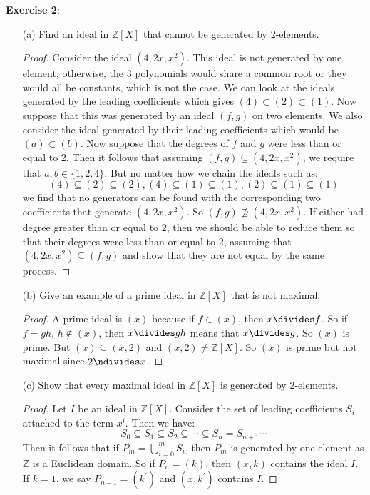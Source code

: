 \documentclass{article}
\begin{document}
\textbf{Exercise 2}: 
    \begin{itemize}
        \item [(a)] Find an ideal in $\mathbb{Z}[X]$ that cannot be generated by 2-elements.
            \begin{proof}
                Consider the ideal $(4, 2x, x^{2})$. This ideal is not generated by one element, otherwise, the 3 polynomials would share a common root or they would all be constants, which is not the case. We can look at the ideals generated by the leading coefficients which gives $(4) \subset (2) \subset (1)$. Now suppose that this was generated by an ideal $(f, g)$ on two elements. We also consider the ideal generated by their leading coefficients which would be $(a) \subset (b)$. Now suppose that the degrees of $f$ and $g$ were less than or equal to $2$. Then it follows that assuming $(f, g) \subseteq (4, 2x, x^{2})$, we require that $a, b \in\{1, 2, 4\}$. But no matter how we chain the ideals such as:
                    \begin{equation*}
                        (4) \subseteq (2) \subseteq (2), (4) \subseteq (1) \subseteq (1), (2) \subseteq (1) \subseteq (1)
                    \end{equation*}
                we find that no generators can be found with the corresponding two coefficients that generate $(4, 2x, x^{2})$. So $(f, g) \not\supseteq (4, 2x, x^{2})$. If either had degree greater than or equal to  $2$, then we should be able to reduce them so that their degrees were less than or equal to $2$, assuming that $(4, 2x, x^{2}) \subseteq (f, g)$ and show that they are not equal by the same process.
            \end{proof}

        \item [(b)] Give an example of a prime ideal in $\mathbb{Z}[X]$ that is not maximal.
            \begin{proof}
                A prime ideal is $(x)$ because if $f \in (x)$, then $x \divides f$. So if $f = gh$, $h \notin (x)$, then $x \divides gh$ means that $x \divides g$. So $(x)$ is prime. But $(x) \subseteq (x, 2)$ and $(x, 2) \neq \mathbb{Z}[X]$. So $(x)$ is prime but not maximal since $2 \ndivides x$.
            \end{proof}

        \item [(c)] Show that every maximal ideal in $\mathbb{Z}[X]$ is generated by $2$-elements. 
            \begin{proof}
                Let $I$ be an ideal in $\mathbb{Z}[X]$. Consider the set of leading coefficients $S_{i}$ attached to the term $x^{i}$. Then we have:
                    \begin{equation*}
                        S_{0} \subseteq S_{1} \subseteq S_{2} \subseteq \cdots \subseteq S_{n} = S_{n + 1} \cdots
                    \end{equation*}
                Then it follows that if $P_{m} = \bigcup_{i = 0}^{m} S_{i}$, then $P_{m}$ is generated by one element as $\mathbb{Z}$ is a Euclidean domain. So if $P_{n} = (k)$, then $(x, k)$ contains the ideal $I$. If $k = 1$, we say $P_{n - 1} = (k^{\prime})$ and $(x, k^{\prime})$ contains $I$. 


\end{proof}
\end{itemize}
\end{document}
